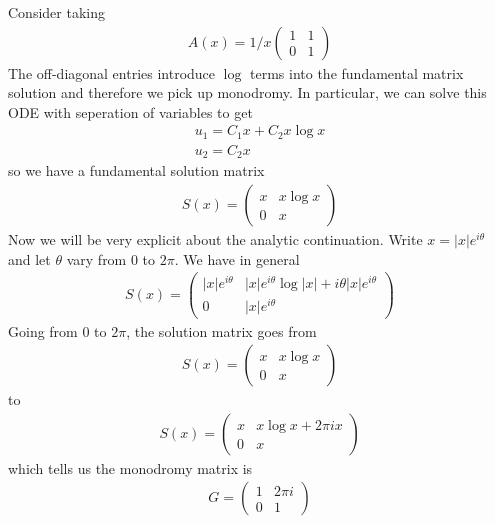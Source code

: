 \begin{example}
	Consider taking \begin{align*}
		A(x) = 1/x\begin{pmatrix}
			          1 & 1 \\
			          0 & 1
		          \end{pmatrix}
	\end{align*} The off-diagonal entries introduce $\log$ terms into the fundamental
	matrix solution and therefore we pick up monodromy. In particular, we can solve
	this ODE with seperation of variables to get \begin{align*}
		u_1 = C_1x + C_2x\log x \\
		u_2 = C_2x
	\end{align*} so we have a fundamental solution matrix \begin{align*}
		S(x) = \begin{pmatrix}
			       x & x\log x \\
			       0 & x
		       \end{pmatrix}
	\end{align*} Now we will be very explicit about the analytic continuation. Write
	$x = |x|e^{i\theta}$ and let $\theta$ vary from $0$ to $2\pi$. We have in general \begin{align*}
		S(x) = \begin{pmatrix}
			       |x|e^{i\theta} & |x|e^{i\theta}\log |x| + i\theta |x|e^{i\theta} \\
			       0              & |x|e^{i\theta}
		       \end{pmatrix}
	\end{align*}
	Going from $0$ to $2\pi$, the solution matrix goes from \begin{align*}
		S(x) = \begin{pmatrix}
			       x & x\log x \\
			       0 & x
		       \end{pmatrix}
	\end{align*} to \begin{align*}
		S(x) = \begin{pmatrix}
			       x & x\log x + 2\pi ix \\
			       0 & x
		       \end{pmatrix}
	\end{align*} which tells us the monodromy matrix is \begin{align*}
		G = \begin{pmatrix}
			    1 & 2\pi i \\
			    0 & 1
		    \end{pmatrix}
	\end{align*}
\end{example}

